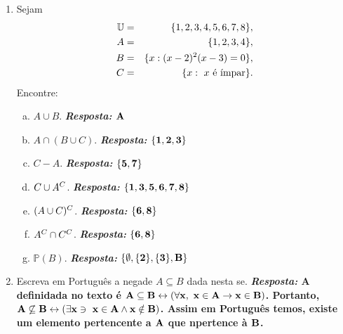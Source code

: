 \begin{enumerate}[{\bf 1.}]
\item Sejam
\begin{eqnarray*}
\mathbb{U}&=&\{1,2,3,4,5,6,7,8\},\\
A&=&\{1,2,3,4\},\\
B&=&\{x:(x-2)^2(x-3)=0\},\\
C&=&\{x:\espaco x \textrm{ \'e \ih mpar}\}.
\end{eqnarray*}
Encontre:
\begin{enumerate}[a)]
\item $A\cup B$. {\bf{\it Resposta:} ${\bf A}$}
\item $A\cap(B\cup C)$. {\bf{\it Resposta:} ${\bf \{1,2,3\}}$}
\item $C-A$. {\bf{\it Resposta:} ${\bf \{5,7\}}$}
\item $C\cup A^C$. {\bf{\it Resposta:} ${\bf \{1,3,5,6,7,8\}}$}
\item $(A\cup C)^C$. {\bf{\it Resposta:} ${\bf \{6,8\}}$}
\item $A^C\cap C^C$. {\bf{\it Resposta:} ${\bf \{6,8\}}$}
\item $\mathbb{P}(B)$. {\bf{\it Resposta:} ${\bf \{\emptyset,\{2\},\{3\},B\}}$}
\end{enumerate}

\item Escreva em Portugu\^es a nega\cao de $A\subseteq B$ dada nesta se\caoi.
{\bf{\it Resposta:} A defini\cao dada no texto \'e ${\bf A \subseteq B \leftrightarrow (\forall x,\textrm{ } x\in A \to x\in B)}$. Portanto, ${\bf A \not\subseteq B \leftrightarrow (\exists x \ni \textrm{ } x\in A \wedge x\notin B)}$. Assim em Portugu\^es temos, existe um elemento pertencente a ${\bf A}$ que n\ao pertence \`a ${\bf B}$.}


\end{enumerate}
